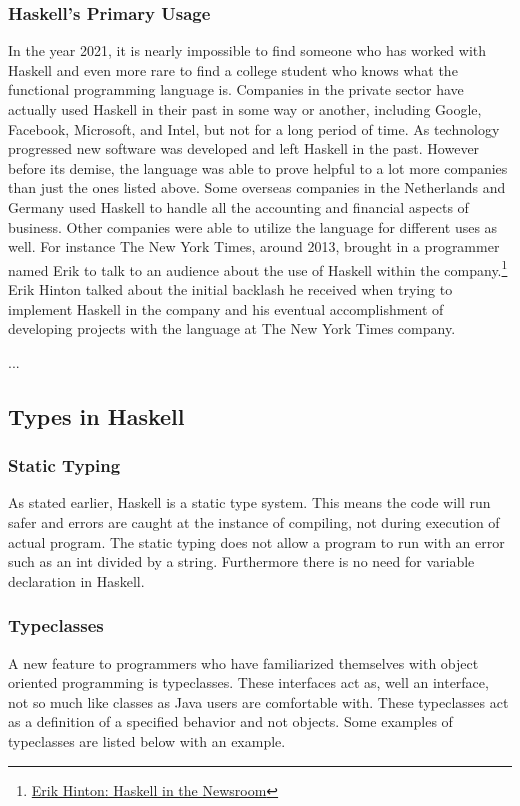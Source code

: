 \documentclass{article}
\begin{document}
        \subsubsection{Haskell's Primary Usage}
        In the year 2021, it is nearly impossible to find someone who has worked with Haskell and even more rare to find a college student who knows what the functional programming language is. Companies in the private sector have actually used Haskell in their past in some way or another, including Google, Facebook, Microsoft, and Intel, but not for a long period of time. As technology progressed new software was developed and left Haskell in the past. However before its demise, the language was able to prove helpful to a lot more companies than just the ones listed above. Some overseas companies in the Netherlands and Germany used Haskell to handle all the accounting and financial aspects of business. Other companies were able to utilize the language for different uses as well. For instance The New York Times, around 2013, brought in a programmer named Erik to talk to an audience about the use of Haskell within the company.\footnote{\href{https://www.infoq.com/presentations/haskell-newsroom-nyt/}{Erik Hinton: Haskell in the Newsroom}} Erik Hinton talked about the initial backlash he received when trying to implement Haskell in the company and his eventual accomplishment of developing projects with the language at The New York Times company.
        
        \medskip ...

\subsection{Types in Haskell}

    \subsubsection{Static Typing}
    As stated earlier, Haskell is a static type system. This means the code will run safer and errors are caught at the instance of compiling, not during execution of actual program. The static typing does not allow a program to run with an error such as an int divided by a string. Furthermore there is no need for variable declaration in Haskell. 
    
    \subsubsection{Typeclasses}
    A new feature to programmers who have familiarized themselves with object oriented programming is typeclasses. These interfaces act as, well an interface, not so much like classes as Java users are comfortable with. These typeclasses act as a definition of a specified behavior and not objects. Some examples of typeclasses are listed below with an example.
    \medskip
    \medskip
    
\end{document}
